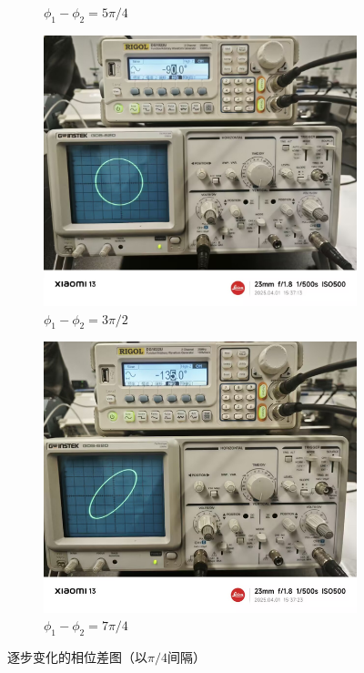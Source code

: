 \documentclass[12pt,a4paper]{article}
\begin{document}
\begin{figure}[H]
\begin{subfigure}[b]{0.23\textwidth}
			\caption{$\phi_1-\phi_2=5\pi/4$}
			\label{fig:sub5pi4}
		\end{subfigure}
		\hfill
		\begin{subfigure}[b]{0.23\textwidth}
			\centering
			\includegraphics[width=\textwidth]{270.jpg}
			\caption{$\phi_1-\phi_2=3\pi/2$}
			\label{fig:sub3pi2}
		\end{subfigure}
		\hfill
		\begin{subfigure}[b]{0.23\textwidth}
			\centering
			\includegraphics[width=\textwidth]{315.jpg}
			\caption{$\phi_1-\phi_2=7\pi/4$}
			\label{fig:sub7pi4}
		\end{subfigure}
		
		\caption{逐步变化的相位差图（以$\pi/4$间隔）}
		\label{fig:chart2}
	\end{figure}
\end{document}

